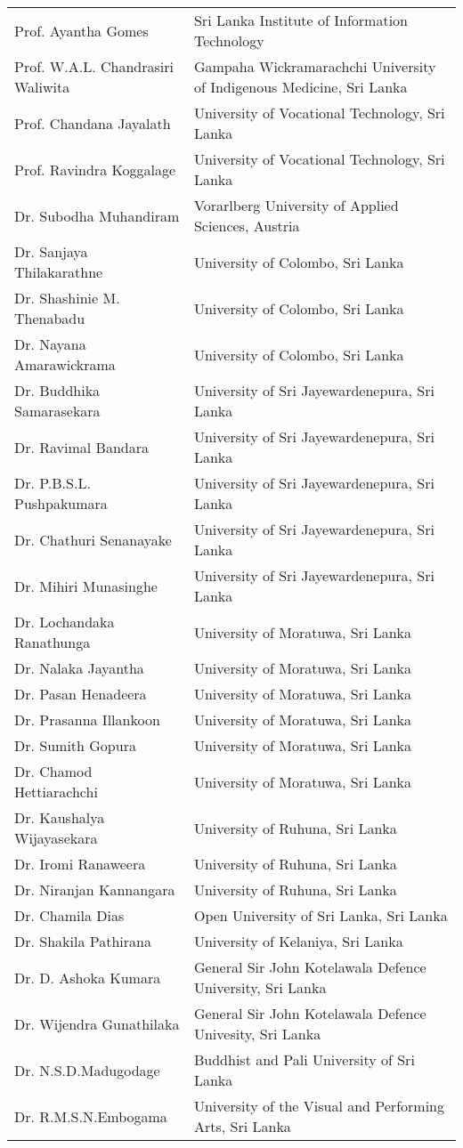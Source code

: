 \begin{longtable}{ L{4.8cm}  L{6.8cm} }  

Prof. Ayantha Gomes &  Sri Lanka Institute of Information Technology\\
Prof. W.A.L. Chandrasiri Waliwita &  Gampaha Wickramarachchi University of Indigenous Medicine, Sri Lanka\\
Prof. Chandana Jayalath &  University of Vocational Technology, Sri Lanka\\
Prof. Ravindra Koggalage &  University of Vocational Technology, Sri Lanka\\
Dr. Subodha Muhandiram &  Vorarlberg University of Applied Sciences, Austria\\

Dr. Sanjaya Thilakarathne &  University of Colombo, Sri Lanka\\
Dr. Shashinie M. Thenabadu &  University of Colombo, Sri Lanka\\
Dr. Nayana Amarawickrama &  University of Colombo, Sri Lanka\\
Dr. Buddhika Samarasekara &  University of Sri Jayewardenepura, Sri Lanka\\
Dr. Ravimal Bandara &  University of Sri Jayewardenepura, Sri Lanka\\
Dr. P.B.S.L. Pushpakumara &  University of Sri Jayewardenepura, Sri Lanka\\
Dr. Chathuri Senanayake &  University of Sri Jayewardenepura, Sri Lanka\\
Dr. Mihiri Munasinghe &  University of Sri Jayewardenepura, Sri Lanka\\
Dr. Lochandaka Ranathunga &  University of Moratuwa, Sri Lanka\\
Dr. Nalaka Jayantha &  University of Moratuwa, Sri Lanka\\
Dr. Pasan Henadeera &  University of Moratuwa, Sri Lanka\\
Dr. Prasanna Illankoon &  University of Moratuwa, Sri Lanka\\
Dr. Sumith Gopura &  University of Moratuwa, Sri Lanka\\
Dr. Chamod Hettiarachchi &  University of Moratuwa, Sri Lanka\\
Dr. Kaushalya Wijayasekara &  University of Ruhuna, Sri Lanka\\
Dr. Iromi Ranaweera &  University of Ruhuna, Sri Lanka\\
Dr. Niranjan Kannangara &  University of Ruhuna, Sri Lanka\\
Dr. Chamila Dias &  Open University of Sri Lanka, Sri Lanka\\
Dr. Shakila Pathirana &  University of Kelaniya, Sri Lanka\\
Dr. D. Ashoka Kumara &  General Sir John Kotelawala Defence University, Sri Lanka\\
Dr. Wijendra Gunathilaka &  General Sir John Kotelawala Defence Univesity, Sri Lanka\\
Dr. N.S.D.Madugodage &  Buddhist and Pali University of Sri Lanka\\
Dr. R.M.S.N.Embogama &  University of the Visual and Performing Arts, Sri Lanka\\


\end{longtable}
